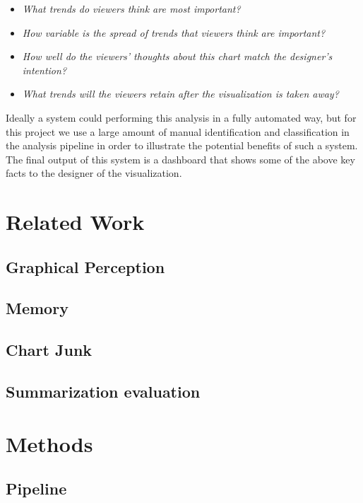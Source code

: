 \documentclass{sigchi}
\begin{document}
\begin{itemize}
  \item \textit{What trends do viewers think are most important?}
  \item \textit{How variable is the spread of trends that viewers
  think are important?}
  \item \textit{How well do the viewers' thoughts about this chart
  match the designer's intention?}
  \item \textit{What trends will the viewers retain after the
  visualization is taken away?}
\end{itemize}

Ideally a system could performing this analysis in a fully automated
way, but for this project we use a large amount of manual
identification and classification in the analysis pipeline in order to
illustrate the potential benefits of such a system. The final output
of this system is a dashboard that shows some of the above key facts
to the designer of the visualization.

\section{Related Work}

\subsection{Graphical Perception}

\subsection{Memory}

\subsection{Chart Junk}

\subsection{Summarization evaluation}

\section{Methods}

\subsection{Pipeline}
\end{document}
